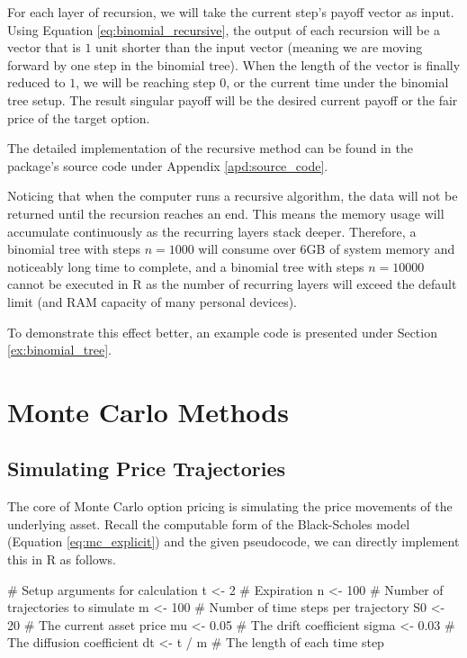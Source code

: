 For each layer of recursion, we will take the current step's payoff vector as input. Using Equation \ref{eq:binomial_recursive}, the output of each recursion will be a vector that is $1$ unit shorter than the input vector (meaning we are moving forward by one step in the binomial tree). When the length of the vector is finally reduced to $1$, we will be reaching step $0$, or the current time under the binomial tree setup. The result singular payoff will be the desired current payoff or the fair price of the target option.

The detailed implementation of the recursive method can be found in the package's source code under Appendix \ref{apd:source_code}.

Noticing that when the computer runs a recursive algorithm, the data will not be returned until the recursion reaches an end. This means the memory usage will accumulate continuously as the recurring layers stack deeper. Therefore, a binomial tree with steps $n=1000$ will consume over 6GB of system memory and noticeably long time to complete, and a binomial tree with steps $n=10000$ cannot be executed in R as the number of recurring layers will exceed the default limit (and RAM capacity of many personal devices).

To demonstrate this effect better, an example code is presented under Section \ref{ex:binomial_tree}.

\section{Monte Carlo Methods} \label{sec:mc_dev}

\subsection{Simulating Price Trajectories}

The core of Monte Carlo option pricing is simulating the price movements of the underlying asset. Recall the computable form of the Black-Scholes model (Equation \ref{eq:mc_explicit}) and the given pseudocode, we can directly implement this in R as follows.

\begin{Rminted}
# Setup arguments for calculation
t <- 2 # Expiration
n <- 100 # Number of trajectories to simulate
m <- 100 # Number of time steps per trajectory
S0 <- 20 # The current asset price
mu <- 0.05 # The drift coefficient
sigma <- 0.03 # The diffusion coefficient
dt <- t / m # The length of each time step
\end{Rminted}


